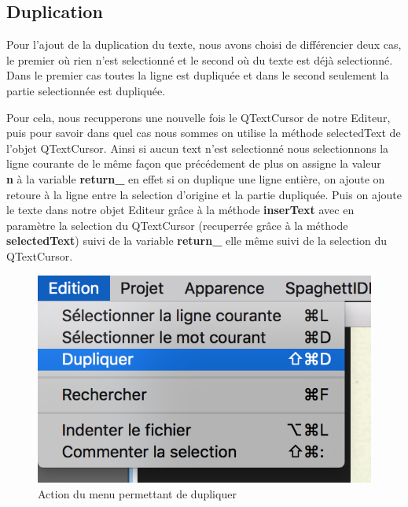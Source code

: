 \documentclass[a4paper,12pt]{article}
\begin{document}
	\newpage

\subsection{Duplication}

	Pour l'ajout de la duplication du texte, nous avons choisi de différencier deux cas, le premier où rien n'est selectionné et le second où du texte est déjà selectionné. Dans le premier cas toutes la ligne est dupliquée et dans le second seulement la partie selectionnée est dupliquée.

	Pour cela, nous recupperons une nouvelle fois le QTextCursor de notre Editeur, puis pour savoir dans quel cas nous sommes on utilise la méthode selectedText de l'objet QTextCursor. Ainsi si aucun text n'est selectionné nous selectionnons la ligne courante de le même façon que précédement de plus on assigne la valeur  \textbf{\\n} à la variable \textbf{return\_} en effet si on duplique une ligne entière, on ajoute on retoure à la ligne entre la selection d'origine et la partie dupliquée. Puis on ajoute le texte dans notre objet Editeur grâce à la méthode \textbf{inserText} avec en paramètre la selection du QTextCursor (recuperrée grâce à la méthode \textbf{selectedText}) suivi de la variable \textbf{return\_} elle même suivi de la selection du QTextCursor.

	\begin{figure}[h!]
		\begin{center}
			\includegraphics[scale=0.8]{images/imgs_edit/utilisation_duplication}
			\caption{Action du menu permettant de dupliquer}
		\end{center}
	\end{figure}
\end{document}
